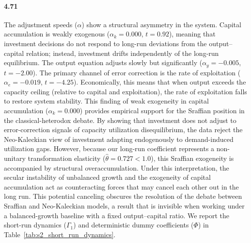 \paragraph{4.71}
The adjustment speeds ($\alpha$) show a structural asymmetry in the system. Capital accumulation is weakly exogenous ($\alpha_k = 0.000$, $t = 0.92$), meaning that investment decisions do not respond to long-run deviations from the output--capital relation; instead, investment drifts independently of the long-run equilibrium. The output equation adjusts slowly but significantly ($\alpha_y = -0.005$, $t = -2.00$). The primary channel of error correction is the rate of exploitation ($\alpha_e = -0.019$, $t = -4.25$). Economically, this means that when output exceeds the capacity ceiling (relative to capital and exploitation), the rate of exploitation falls to restore system stability. This finding of weak exogeneity in capital accumulation ($\alpha_k = 0.000$) provides empirical support for the Sraffian position in the classical-heterodox debate. By showing that investment does not adjust to error-correction signals of capacity utilization disequilibrium, the data reject the Neo-Kaleckian view of investment adapting endogenously to demand-induced utilization gaps. However, because our long-run coefficient represents a non-unitary transformation elasticity ($\hat{\theta} = 0.727 < 1.0$), this Sraffian exogeneity is accompanied by structural overaccumulation. Under this interpretation, the secular instability of unbalanced growth and the exogeneity of capital accumulation act as counteracting forces that may cancel each other out in the long run. This potential canceling obscures the resolution of the debate between Sraffian and Neo-Kaleckian models, a result that is invisible when working under a balanced-growth baseline with a fixed output--capital ratio. We report the short-run dynamics ($\Gamma_1$) and deterministic dummy coefficients ($\Phi$) in Table~\ref{tab:s2_short_run_dynamics}.


